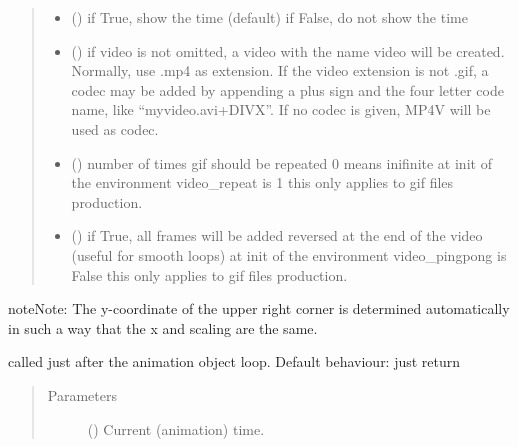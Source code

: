 \documentclass[letterpaper,10pt,english]{sphinxmanual}
\begin{document}
\begin{fulllineitems}
\begin{fulllineitems}
\begin{quote}
\begin{description}
\begin{itemize}
\item {} 
 () \textendash{} if True, show the time (default)  
if False, do not show the time

\item {} 
 () \textendash{} if video is not omitted, a video with the name video
will be created. 
Normally, use .mp4 as extension. 
If the video extension is not .gif, a codec may be added
by appending a plus sign and the four letter code name,
like “myvideo.avi+DIVX”. 
If no codec is given, MP4V will be used as codec.

\item {} 
 () \textendash{} number of times gif should be repeated 
0 means inifinite 
at init of the environment video\_repeat is 1 
this only applies to gif files production.

\item {} 
 () \textendash{} if True, all frames will be added reversed at the end of the video (useful for smooth loops)
at init of the environment video\_pingpong is False 
this only applies to gif files production.

\end{itemize}

\end{description}\end{quote}

\begin{sphinxadmonition}{note}{Note:}
The y-coordinate of the upper right corner is determined automatically
in such a way that the x and scaling are the same. 
\end{sphinxadmonition}

\end{fulllineitems}


\begin{fulllineitems}
\label{\detokenize{Reference:salabim.Environment.animation_post_tick}}
called just after the animation object loop. 
Default behaviour: just return
\begin{quote}\begin{description}
\item[{Parameters}] \leavevmode
{} () \textendash{} Current (animation) time.


\end{description}
\end{quote}
\end{fulllineitems}
\end{fulllineitems}
\end{document}

